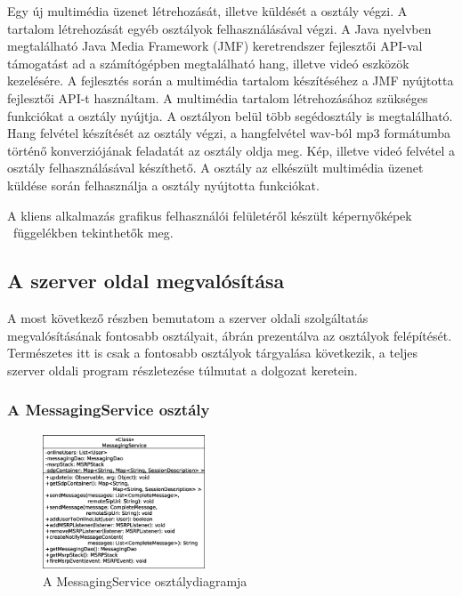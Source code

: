 \medskip

Egy új multimédia üzenet létrehozását, illetve küldését a  osztály végzi. A tartalom létrehozását egyéb osztályok felhasználásával végzi. A Java nyelvben megtalálható Java Media Framework (JMF) keretrendszer \cite{jmf} fejlesztői API-val támogatást ad a számítógépben megtalálható hang, illetve videó eszközök kezelésére. A fejlesztés során a multimédia tartalom készítéséhez a JMF nyújtotta fejlesztői API-t használtam. A multimédia tartalom létrehozásához szükséges funkciókat a  osztály nyújtja. A  osztályon belül több segédosztály is megtalálható. Hang felvétel készítését az  osztály végzi, a hangfelvétel wav-ból mp3 formátumba történő konverziójának feladatát az  osztály oldja meg. Kép, illetve videó felvétel a  osztály felhasználásával készíthető. A  osztály az elkészült multimédia üzenet küldése során felhasználja a  osztály nyújtotta funkciókat.

\medskip

A kliens alkalmazás grafikus felhasználói felületéről készült képernyőképek ~függelékben tekinthetők meg. 

\subsection{A szerver oldal megvalósítása}

A most következő részben bemutatom a szerver oldali szolgáltatás megvalósításának fontosabb osztályait, ábrán prezentálva az osztályok felépítését. Természetes itt is csak a fontosabb osztályok tárgyalása következik, a teljes szerver oldali program részletezése túlmutat a dolgozat keretein.

\newpage
\subsubsection*{A MessagingService osztály}
\label{sec:server_messagingservice}

\begin{figure}
  \vspace{-15pt}
  \begin{center}
    \includegraphics[width=0.43\textwidth]{img/class_diagrams/server/eps/MessagingService.eps}
  \end{center}
  \vspace{-15pt}
  \captionsetup{font=scriptsize}
  \caption{A MessagingService osztálydiagramja}
   \label{fig:class_server_messagingservice}
  \vspace{-10pt}
\end{figure}

